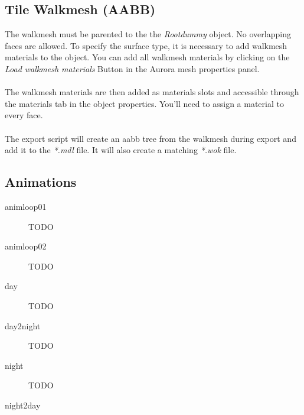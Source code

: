 \subsection*{Tile Walkmesh (AABB)}
The walkmesh must be parented to the the {\textit{Rootdummy}} object.
No overlapping faces are allowed. To specify the surface type, it is necessary
to add walkmesh materials to the object. You can add all walkmesh
materials by clicking on the {\textit{Load walkmesh materials}} Button in the
Aurora mesh properties panel. \\ \\

The walkmesh materials are then added as materials slots and accessible
through the materials tab in the object properties. You'll need to assign
a material to every face. \\ \\

The export script will create an aabb tree from the walkmesh during export
and add it to the {\textit{*.mdl}} file. It will also create a
matching {\textit{*.wok}} file.

\subsection*{Animations}
\begin{description}
    \item[animloop01] TODO
    \item[animloop02] TODO    
    \item[day] TODO
    \item[day2night] TODO
    \item[night] TODO
    \item[night2day]
\end{description}
